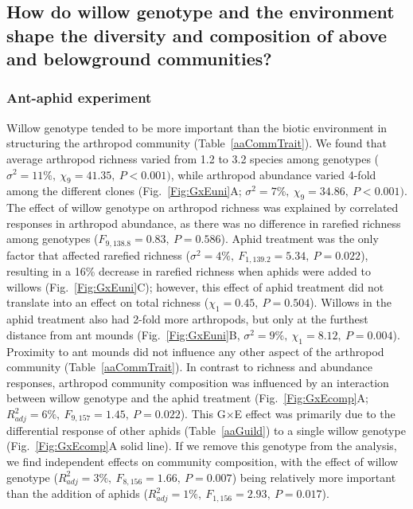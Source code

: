 \documentclass[11pt]{article}
\begin{document}
\subsection*{How do willow genotype and the environment shape the diversity and composition of above and belowground communities?}

\subsubsection*{Ant-aphid experiment}

Willow genotype tended to be more important than the biotic environment
in structuring the arthropod community (Table~\ref{aaCommTrait}). We found that average arthropod richness varied from 1.2 to 3.2
species among genotypes (\(\sigma^2=11\%,\ \chi_9=41.35,\ P<0.001)\), while arthropod abundance
varied 4-fold among the different clones (Fig.~\ref{Fig:GxEuni}A; \(\sigma^2=7\%,\ \chi_9=34.86,\ P<0.001)\).
The effect of willow genotype on arthropod richness was explained by
correlated responses in arthropod abundance, as there was no difference
in rarefied richness among genotypes (\(F_{9,138.8}=0.83,\ P=0.586\)). Aphid
treatment was the only factor that affected rarefied richness
(\(\)\(\sigma^2=4\%,\ F_{1,139.2}=5.34,\ P=0.022\)), resulting in a 16\% decrease in
rarefied richness when aphids were added to willows (Fig.~\ref{Fig:GxEuni}C); however,
this effect of aphid treatment did not translate into an effect on total
richness (\(\chi_1=0.45,\ P=0.504\)). Willows in the aphid treatment also had
2-fold more arthropods, but only at the furthest distance from ant
mounds (Fig.~\ref{Fig:GxEuni}B, \(\sigma^2=9\%,\ \chi_1=8.12,\ P=0.004\)). Proximity to ant mounds did not
influence any other aspect of the arthropod community (Table~\ref{aaCommTrait}). In
contrast to richness and abundance responses, arthropod community
composition was influenced by an interaction between willow genotype and
the aphid treatment (Fig.~\ref{Fig:GxEcomp}A; \(R_{adj}^2=6\%,\ F_{9,157}=1.45,\ P=0.022\)). This
G\(\times\)E effect was primarily due to the differential
response of other aphids (Table~\ref{aaGuild}) to a single willow genotype (Fig.~\ref{Fig:GxEcomp}A solid
line). If we remove this genotype from the analysis, we find
independent effects on community composition, with the effect of willow
genotype (\(R_{adj}^2=3\%,\ F_{8,156}=1.66,\ P=0.007\)) being relatively more important than the
addition of aphids (\(R_{adj}^2=1\%,\ F_{1,156}=2.93,\ P=0.017\)).
\end{document}
